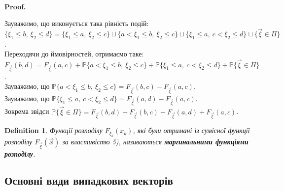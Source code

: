 \documentclass[a4paper, 10pt]{article}
\makeatletter
\theoremstyle{theoremdd}
\newtheorem{definition}[theorem]{Definition}
\renewenvironment{proof}[1][Proof.\\]{\par
\pushQED{\hfill \qed}%
\normalfont \topsep6\p@\@plus6\p@\relax
\trivlist
\item\relax
{\bfseries
#1\@addpunct{.}}\hspace\labelsep\ignorespaces
}{%
\popQED\endtrivlist\@endpefalse
}
\makeatother
\begin{document}
\begin{proof}
Зауважимо, що виконується така рівність подій:\\
$\{\xi_1 \leq b,\ \xi_2 \leq d\} = \{\xi_1 \leq a,\ \xi_2 \leq c\} \sqcup \{a < \xi_1 \leq b,\ \xi_2 \leq c\} \sqcup \{\xi_1 \leq a,\ c < \xi_2 \leq d\} \sqcup \{\vec{\xi} \in \Pi\}$.\\
Переходячи до ймовірностей, отримаємо таке:\\
$F_{\vec{\xi}}(b,d) = F_{\vec{\xi}}(a,c) + \mathbb{P}\{a < \xi_1 \leq b,\ \xi_2 \leq c\} + \mathbb{P}\{\xi_1 \leq a,\ c < \xi_2 \leq d\} + \mathbb{P}\{\vec{\xi} \in \Pi\}$.\\
Зауважимо, що $\mathbb{P}\{a < \xi_1 \leq b,\ \xi_2 \leq c\} = F_{\vec{\xi}}(b,c) - F_{\vec{\xi}}(a,c)$.\\
Зауважимо, що $\mathbb{P}\{\xi_1 \leq a,\ c < \xi_2 \leq d\} = F_{\vec{\xi}}(a,d) - F_{\vec{\xi}}(a,c)$.\\
Зокрема звідси $\mathbb{P}\{\vec{\xi} \in \Pi\} = F_{\vec{\xi}}(b,d) - F_{\vec{\xi}}(b,c) - F_{\vec{\xi}}(a,d) + F_{\vec{\xi}}(a,c)$.
\end{proof}

\begin{definition}
Функції розподілу $F_{\xi_k}(x_k)$, які були отримані із сумісної функції розподілу $F_{\vec{\xi}}(\vec{x})$ за властивістю 5), називаються \textbf{маргинальними функціями розподілу}.
\end{definition}

\subsection{Основні види випадкових векторів}
\end{document}

